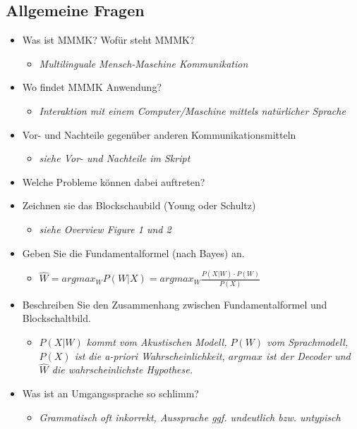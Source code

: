 \subsection{Allgemeine Fragen}
\begin{itemize}
\item Was ist MMMK? Wofür steht MMMK?
\begin{itemize}
\item \emph{Multilinguale Mensch-Maschine Kommunikation}
\end{itemize}
\item Wo findet MMMK Anwendung?
\begin{itemize}
\item \emph{Interaktion mit einem Computer/Maschine  mittels natürlicher Sprache}
\end{itemize}
\item Vor- und Nachteile gegenüber anderen Kommunikationsmitteln
\begin{itemize}
\item \emph{siehe Vor- und Nachteile im Skript} %
\end{itemize}
\item Welche Probleme können dabei auftreten?
\item Zeichnen sie das Blockschaubild (Young oder Schultz)
\begin{itemize}
\item \emph{siehe Overview Figure 1 und 2} %
\end{itemize}
\item Geben Sie die Fundamentalformel (nach Bayes) an.
\begin{itemize}
\item $\hat{W} = argmax_{W} P(W | X) = argmax_{W} \frac{P(X|W) \cdot P(W)}{P(X)}$ 
\end{itemize}
\item Beschreiben Sie den Zusammenhang zwischen Fundamentalformel und Blockschaltbild.
\begin{itemize}
\item\emph{$P(X|W)$ kommt vom Akustischen Modell, $P(W)$ vom Sprachmodell, $P(X)$ ist die a-priori Wahrscheinlichkeit, 
$argmax$ ist der Decoder und $\hat{W}$ die wahrscheinlichste Hypothese.}
\end{itemize}
\item Was ist an Umgangssprache so schlimm?
\begin{itemize}
\item \emph{Grammatisch oft inkorrekt, Aussprache ggf. undeutlich bzw. untypisch}

\end{itemize}
\end{itemize}
